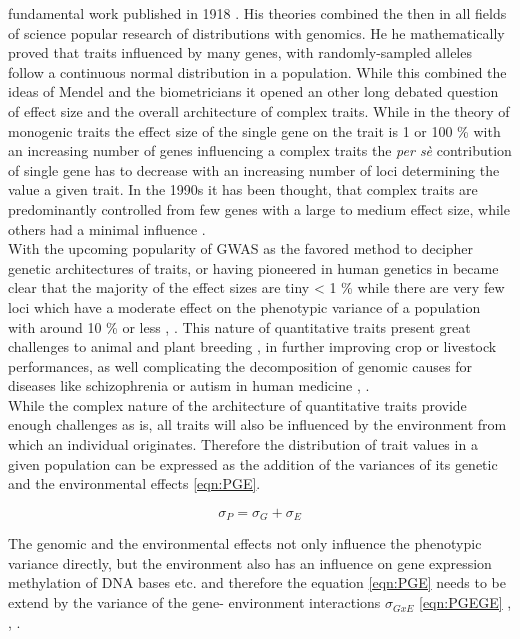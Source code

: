 fundamental work published in 1918 \cite{fisher1919xv}. His theories combined the then in all fields of science popular
research of distributions with genomics. He he mathematically proved that traits influenced by many genes, with
randomly-sampled alleles follow a continuous normal distribution in a population. While this combined the ideas of
Mendel and the biometricians it opened an other long debated question of effect size and the overall architecture of
complex traits. While in the theory of monogenic traits the effect size of the single gene on the trait is 1 or 100 \%
with an increasing number of genes influencing a complex traits the \textit{per sè} contribution of single gene has to
decrease with an increasing number of loci determining the value a given trait. In the 1990s it has been thought, that
complex traits are predominantly controlled from few genes with a large to medium effect size, while others had a
minimal influence
\cite{zhang2018esti}. \\
With the upcoming popularity of GWAS as the favored method to decipher genetic architectures of traits, or having
pioneered in human genetics in became clear that the majority of the effect sizes are tiny < 1 \% while there are very
few loci which have a moderate effect on the phenotypic variance of a population with around 10 \% or less
\cite{korte2013advantages}, \cite{stringer2011}. This nature of quantitative traits present great challenges to animal
\cite{goddard2009} and plant breeding \cite{wurschum2012}, in further improving crop or livestock performances, as well
complicating the decomposition of genomic causes for diseases like
schizophrenia or autism in human medicine \cite{de2014}, \cite{purcell2014}. \\
While the complex nature of the architecture of quantitative traits provide enough challenges as is, all traits will
also be influenced by the environment from which an individual originates. Therefore the distribution of trait values in
a given population can be expressed as the addition of the variances of its genetic and the environmental effects
\ref{eqn:PGE}.

\begin{equation}
 \sigma_{P} = \sigma_{G} + \sigma_{E}
 \label{eqn:PGE}
\end{equation}

The genomic and the environmental effects not only influence the phenotypic variance directly, but the
environment also has an influence on gene expression methylation of DNA bases etc. and therefore the equation
\ref{eqn:PGE} needs to be extend by the variance of the gene- environment interactions $\sigma_{GxE}$
\ref{eqn:PGEGE} , \cite{lynch1998}, \cite{walsh2018}.
        
